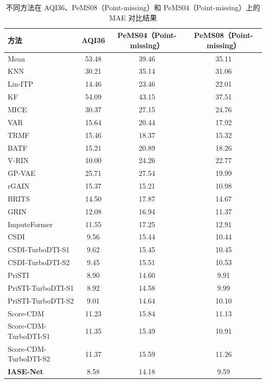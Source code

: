 \begin{table}[H]
\caption{不同方法在 \textsf{AQI36}、\textsf{PeMS08}（Point-missing）和 \textsf{PeMS04}（Point-missing）上的 MAE 对比结果}
\label{tab:mae_only_point_missing}
\centering
\small
\setlength{\tabcolsep}{5pt}
\renewcommand{\arraystretch}{1.15}
\begin{tabular}{lccc}
\toprule
\textbf{方法} & \textbf{\textsf{AQI36}} & \textbf{\textsf{PeMS04}（Point-missing）} & \textbf{\textsf{PeMS08}（Point-missing）} \\
\midrule
Mean              & 53.48 & 39.46 & 35.11 \\
KNN               & 30.21 & 35.14 & 31.06 \\
Lin-ITP           & 14.46 & 23.46 & 22.01 \\
KF                & 54.09 & 43.15 & 37.51 \\
MICE              & 30.37 & 27.15 & 24.76 \\
VAR               & 15.64 & 20.44 & 17.92 \\
TRMF              & 15.46 & 18.37 & 15.32 \\
BATF              & 15.21 & 20.89 & 18.26 \\
V-RIN             & 10.00 & 24.26 & 22.77 \\
GP-VAE            & 25.71 & 27.54 & 19.99 \\
rGAIN             & 15.37 & 15.21 & 10.98 \\
BRITS             & 14.50 & 17.87 & 14.67 \\
GRIN              & 12.08 & 16.94 & 11.37 \\
ImputeFormer      & 11.55 & 17.25 & 12.91 \\
\midrule
CSDI        & 9.56  & 15.44 & 10.44 \\
CSDI-TurboDTI-S1
                  & 9.62 
                  &  15.45 
                  & 10.45 \\
CSDI-TurboDTI-S2
                  & 9.45 
                  & 15.51 
                  & 10.53 \\
\midrule
PriSTI      & 8.90  & 14.60  & 9.91 \\
PriSTI-TurboDTI-S1
                  & 8.92 
                  & 14.58 
                  & 9.99 \\
                   
PriSTI-TurboDTI-S2
                  & 9.01 
                  & 14.64
                  & 10.10 \\
\midrule
Score-CDM    & 11.23 & 15.84 & 11.13  \\
Score-CDM-TurboDTI-S1
                  & 11.35 
                  & 15.49 
                  & 10.91 \\               
Score-CDM-TurboDTI-S2
                  & 11.37 
                  & 15.59 
                  & 11.26  \\        
\midrule
\textbf{IASE-Net}    
                  & 8.58 & 14.18 & 9.59  \\
\bottomrule
\end{tabular}
\end{table}


